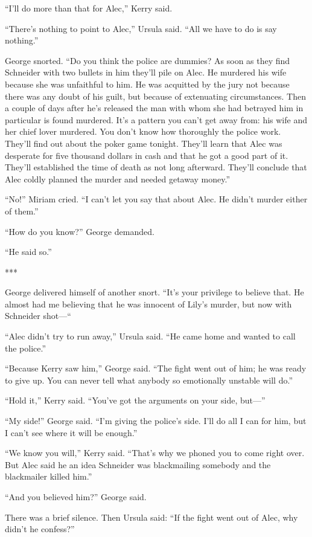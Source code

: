 \documentclass{novel}
\begin{document}
“I’ll do more than that for Alec,” Kerry said.

“There’s nothing to point to Alec,” Ursula said. “All we have to do is say nothing.”

George snorted. “Do you think the police are dummies? As soon as they find Schneider with two bullets in him they’ll pile on Alec. He murdered his wife because she was unfaithful to him. He was acquitted by the jury not because there was any doubt of his guilt, but because of extenuating circumstances. Then a couple of days after he’s released the man with whom she had betrayed him in particular is found murdered. It’s a pattern you can’t get away from: his wife and her chief lover murdered. You don’t know how thoroughly the police work. They’ll find out about the poker game tonight. They’ll learn that Alec was desperate for five thousand dollars in cash and that he got a good part of it. They’ll established the time of death as not long afterward. They’ll conclude that Alec coldly planned the murder and needed getaway money.”

“No!” Miriam cried. “I can’t let you say that about Alec. He didn’t murder either of them.”

“How do you know?” George demanded.

“He said so.”

***

George delivered himself of another snort. “It’s your privilege to believe that. He almost had me believing that he was innocent of Lily’s murder, but now with Schneider shot—“

“Alec didn’t try to run away,” Ursula said. “He came home and wanted to call the police.”

“Because Kerry saw him,” George said. “The fight went out of him; he was ready to give up. You can never tell what anybody so emotionally unstable will do.”

“Hold it,” Kerry said. “You’ve got the arguments on your side, but—”

“My side!” George said. “I’m giving the police’s side. I’ll do all I can for him, but I can’t see where it will be enough.”

“We know you will,” Kerry said. “That’s why we phoned you to come right over. But Alec said he an idea Schneider was blackmailing somebody and the blackmailer killed him.”

“And you believed him?” George said.

There was a brief silence. Then Ursula said: “If the fight went out of Alec, why didn’t he confess?”
\end{document}
